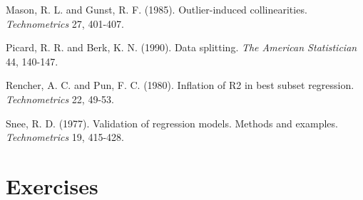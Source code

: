 \begin{multicols}{2}
Mason, R. L. and Gunst, R. F. (1985). Outlier-induced
collinearities. \textit{Technometrics} 27, 401-407.

Picard, R. R. and Berk, K. N. (1990). Data splitting. \textit{The
American Statistician} 44, 140-147.

Rencher, A. C. and Pun, F. C. (1980). Inflation of R2 in best subset
regression. \textit{Technometrics} 22, 49-53.

Snee, R. D. (1977). Validation of regression models. Methods and
examples. \textit{Technometrics} 19, 415-428.



\end{multicols}


\section{Exercises}


